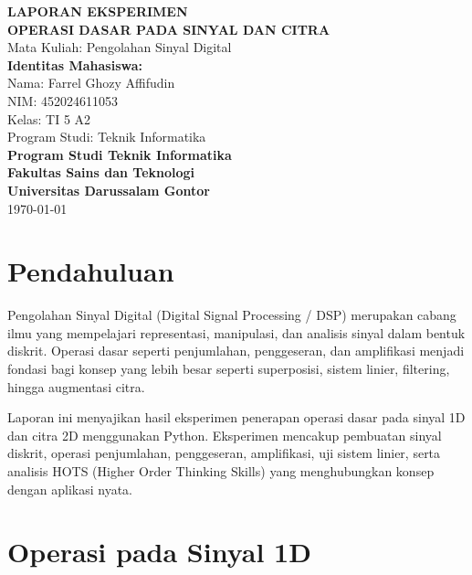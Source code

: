 \documentclass[12pt,a4paper]{article}
\begin{document}
\begin{titlepage}
\begin{center}
\vspace*{1cm}
\Large\textbf{LAPORAN EKSPERIMEN}\\[0.3cm]
\Large\textbf{OPERASI DASAR PADA SINYAL DAN CITRA}\\[0.6cm]
\normalsize
Mata Kuliah: Pengolahan Sinyal Digital\\[1cm]
\small
\textbf{Identitas Mahasiswa:}\\
Nama: Farrel Ghozy Affifudin\\
NIM: 452024611053\\
Kelas: TI 5 A2\\
Program Studi: Teknik Informatika\\[1cm]
\vfill
\small
\textbf{Program Studi Teknik Informatika}\\
\textbf{Fakultas Sains dan Teknologi}\\
\textbf{Universitas Darussalam Gontor}\\
\today
\end{center}
\end{titlepage}

\singlespacing
\setlength{\parskip}{2pt}
\setlength{\floatsep}{4pt}
\setlength{\textfloatsep}{4pt}
\setlength{\intextsep}{4pt}

\section{Pendahuluan}

Pengolahan Sinyal Digital (Digital Signal Processing / DSP) merupakan cabang ilmu yang mempelajari representasi, manipulasi, dan analisis sinyal dalam bentuk diskrit. Operasi dasar seperti penjumlahan, penggeseran, dan amplifikasi menjadi fondasi bagi konsep yang lebih besar seperti superposisi, sistem linier, filtering, hingga augmentasi citra.

Laporan ini menyajikan hasil eksperimen penerapan operasi dasar pada sinyal 1D dan citra 2D menggunakan Python. Eksperimen mencakup pembuatan sinyal diskrit, operasi penjumlahan, penggeseran, amplifikasi, uji sistem linier, serta analisis HOTS (Higher Order Thinking Skills) yang menghubungkan konsep dengan aplikasi nyata.

\section{Operasi pada Sinyal 1D}
\end{document}
